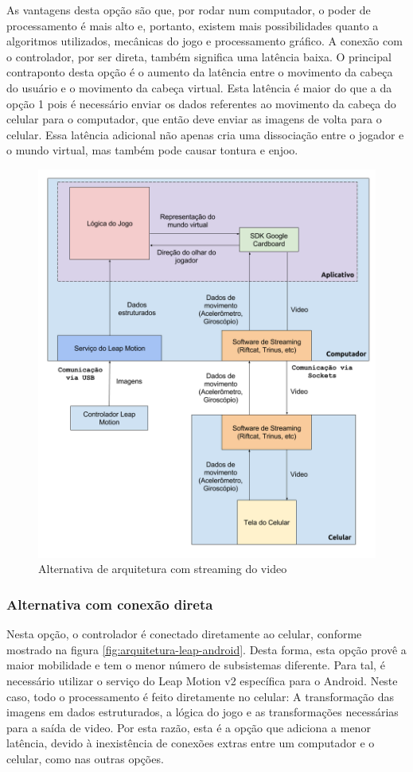 As vantagens desta opção são que, por rodar num computador, o poder de processamento é mais alto e, portanto, existem mais possibilidades quanto a algoritmos utilizados, mecânicas do jogo e processamento gráfico. A conexão com o controlador, por ser direta, também significa uma latência baixa. O principal contraponto desta opção é o aumento da latência entre o movimento da cabeça do usuário e o movimento da cabeça virtual. Esta latência é maior do que a da opção 1 pois é necessário enviar os dados referentes ao movimento da cabeça do celular para o computador, que então deve enviar as imagens de volta para o celular. Essa latência adicional não apenas cria uma dissociação entre o jogador e o mundo virtual, mas também pode causar tontura e enjoo.

\begin{figure}
	\centering
	\includegraphics[width=0.7\linewidth]{images/Arquitetura-leap-pc-riftcat-android}
	\caption{Alternativa de arquitetura com streaming do video}
	\label{fig:Arquitetura-leap-pc-riftcat-android}
\end{figure}

\subsubsection{Alternativa com conexão direta}\label{subsubsec-arquiteturas-leapmotion-android}

Nesta opção, o controlador é conectado diretamente ao celular, conforme mostrado na figura \ref{fig:arquitetura-leap-android}. Desta forma, esta opção provê a maior mobilidade e tem o menor número de subsistemas diferente. Para tal, é necessário utilizar o serviço do Leap Motion v2 específica para o Android. Neste caso, todo o processamento é feito diretamente no celular: A transformação das imagens em dados estruturados, a lógica do jogo e as transformações necessárias para a saída de video. Por esta razão, esta é a opção que adiciona a menor latência, devido à inexistência de conexões extras entre um computador e o celular, como nas outras opções.

